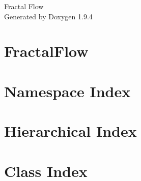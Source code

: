 \documentclass[twoside]{book}
\newcommand{\+}{\discretionary{\mbox{\scriptsize$\hookleftarrow$}}{}{}}
\newcommand{\clearemptydoublepage}{%
    \newpage{\pagestyle{empty}\cleardoublepage}%
  }
\begin{document}
  \raggedbottom
    \hypersetup{pageanchor=false,
                bookmarksnumbered=true,
                pdfencoding=unicode
               }
  \begin{titlepage}
  \vspace*{7cm}
  \begin{center}%
  {\Large Fractal Flow}\\
  \vspace*{1cm}
  {\large Generated by Doxygen 1.9.4}\\
  \end{center}
  \end{titlepage}
  \clearemptydoublepage
  \tableofcontents
  \clearemptydoublepage
  \hypersetup{pageanchor=true}
\chapter{Fractal\+Flow}
\label{md__r_e_a_d_m_e}

\chapter{Namespace Index}

\chapter{Hierarchical Index}

\chapter{Class Index}

\end{document}
